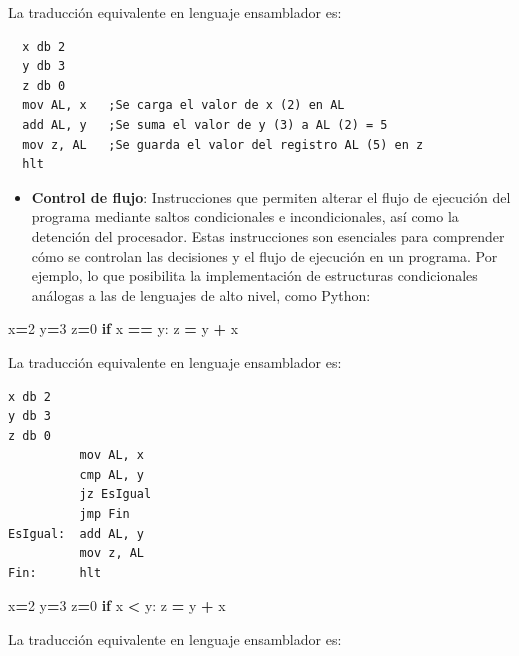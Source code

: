 \documentclass[12pt,oneside]{templates/unerthesis}
\newenvironment{Shaded}{\begin{snugshade}}{\end{snugshade}}
\newcommand{\ControlFlowTok}[1]{\textcolor[rgb]{0.13,0.29,0.53}{\textbf{#1}}}
\newcommand{\DecValTok}[1]{\textcolor[rgb]{0.00,0.00,0.81}{#1}}
\newcommand{\NormalTok}[1]{#1}
\newcommand{\OperatorTok}[1]{\textcolor[rgb]{0.81,0.36,0.00}{\textbf{#1}}}
\providecommand{\tightlist}{%
  \setlength{\itemsep}{0pt}\setlength{\parskip}{0pt}}
\begin{document}
La traducción equivalente en lenguaje ensamblador es:

\begin{lstlisting}
  x db 2
  y db 3
  z db 0
  mov AL, x   ;Se carga el valor de x (2) en AL
  add AL, y   ;Se suma el valor de y (3) a AL (2) = 5
  mov z, AL   ;Se guarda el valor del registro AL (5) en z 
  hlt\end{lstlisting}

\begin{itemize}
\tightlist
\item
  \textbf{Control de flujo}: Instrucciones que permiten alterar el flujo de ejecución del programa mediante saltos condicionales e incondicionales, así como la detención del procesador. Estas instrucciones son esenciales para comprender cómo se controlan las decisiones y el flujo de ejecución en un programa. Por ejemplo, lo que posibilita la implementación de estructuras condicionales análogas a las de lenguajes de alto nivel, como Python:
\end{itemize}

\begin{Shaded}
\begin{Highlighting}[]
\NormalTok{x}\OperatorTok{=}\DecValTok{2}
\NormalTok{y}\OperatorTok{=}\DecValTok{3}
\NormalTok{z}\OperatorTok{=}\DecValTok{0}
\ControlFlowTok{if}\NormalTok{ x }\OperatorTok{==}\NormalTok{ y:}
\NormalTok{  z }\OperatorTok{=}\NormalTok{ y  }\OperatorTok{+}\NormalTok{ x}
\end{Highlighting}
\end{Shaded}

La traducción equivalente en lenguaje ensamblador es:

\begin{lstlisting}
x db 2 
y db 3
z db 0
          mov AL, x
          cmp AL, y
          jz EsIgual
          jmp Fin
EsIgual:  add AL, y
          mov z, AL 
Fin:      hlt\end{lstlisting}

\begin{Shaded}
\begin{Highlighting}[]
\NormalTok{x}\OperatorTok{=}\DecValTok{2}
\NormalTok{y}\OperatorTok{=}\DecValTok{3}
\NormalTok{z}\OperatorTok{=}\DecValTok{0}
\ControlFlowTok{if}\NormalTok{ x }\OperatorTok{\textless{}}\NormalTok{ y:}
\NormalTok{  z }\OperatorTok{=}\NormalTok{ y  }\OperatorTok{+}\NormalTok{ x}
\end{Highlighting}
\end{Shaded}

La traducción equivalente en lenguaje ensamblador es:
\end{document}
